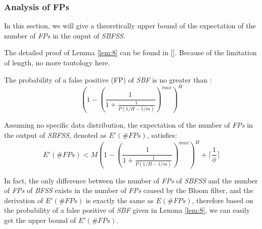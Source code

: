 \documentclass[conference]{IEEEtran}
\begin{document}
\subsubsection{\textbf{Analysis of FPs}}
In this section, we will give a theoretically upper bound of the expectation of the number of \emph{FPs} in the ouput of \emph{SBFSS}.\par
The detailed proof of Lemma \ref{lem:8} can be found in []. Because of the limitation of length, no more tautology here.
\begin{lemma}\label{lem:8}
The probability of a false positive (FP) of \emph{SBF} is no greater than :
\begin{equation}
(1-(\frac{1}{1+\frac{1}{P(1/H-1/m)}})^{max})^H
\end{equation}
\end{lemma}

\begin{theorem}\label{thm:6}
Assuming no specific data distribution, the expectation of the number of \emph{FPs} in the output of \emph{SBFSS}, denoted as $E'(\#FPs)$, satisfies:
\begin{equation}\label{eq:17}
E'(\#FPs)<M(1-(\frac{1}{1+\frac{1}{P(1/H-1/m)}})^{max})^H + \lceil\frac{1}{\phi}\rceil
\end{equation}
\end{theorem}

\begin{IEEEproof}
In fact, the only difference between the number of \emph{FPs} of \emph{SBFSS} and the number of \emph{FPs} of \emph{BFSS} exists in the number of \emph{FPs} caused by the Bloom filter, and the derivation of $E'(\#FPs)$ is exactly the same as $E(\#FPs)$, therefore based on the probability of a false positive of \emph{SBF} given in Lemma \ref{lem:8}, we can easily get the upper bound of $E'(\#FPs)$.
\end{IEEEproof}
\end{document}
